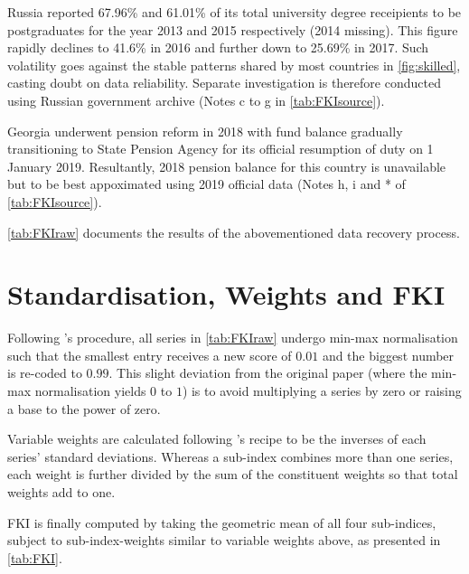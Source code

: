 Russia reported 67.96\% and 61.01\% of its total university degree receipients to be postgraduates for the year 2013 and 2015 respectively (2014 missing). This figure rapidly declines to 41.6\% in 2016 and further down to 25.69\% in 2017. Such volatility goes against the stable patterns shared by most countries in \cref{fig:skilled}, casting doubt on data reliability. Separate investigation is therefore conducted using Russian government archive (Notes c to g in \cref{tab:FKIsource}).

Georgia underwent pension reform in 2018 with fund balance gradually transitioning to State Pension Agency for its official resumption of duty on 1 January 2019. Resultantly, 2018 pension balance for this country is unavailable but to be best appoximated using 2019 official data (Notes h, i and * of \cref{tab:FKIsource}).

\cref{tab:FKIraw} documents the results of the abovementioned data recovery process.

\section{Standardisation, Weights and FKI}

Following \textcite{olivermarquez:2020}'s procedure, all series in \cref{tab:FKIraw} undergo min-max normalisation such that the smallest entry receives a new score of $0.01$ and the biggest number is re-coded to $0.99$. This slight deviation from the original paper (where the min-max normalisation yields $0$ to $1$) is to avoid multiplying a series by zero or raising a base to the power of zero.

Variable weights are calculated following \textcite{olivermarquez:2020}'s recipe to be the inverses of each series' standard deviations. Whereas a sub-index combines more than one series, each weight is further divided by the sum of the constituent weights so that total weights add to one.

FKI is finally computed by taking the geometric mean of all four sub-indices, subject to sub-index-weights similar to variable weights above, as presented in \cref{tab:FKI}.


